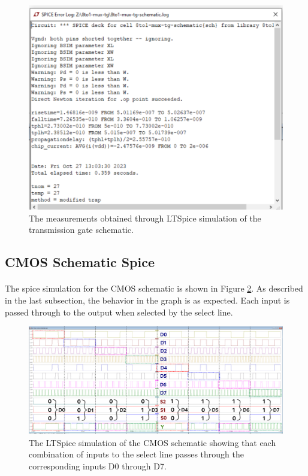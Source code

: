 \documentclass{article}
\begin{document}
    \begin{figure}[H]
      \centering
      \includegraphics[width=0.5\linewidth, frame]{screenshots/tg/schem/meas.png}
      \caption{The measurements obtained through LTSpice simulation of the transmission gate schematic.}
      \label{fig:tgschemmeas}
    \end{figure}



  \subsection{CMOS Schematic Spice}
    \paragraph{}
    The spice simulation for the CMOS schematic is shown in Figure \ref{fig:cmosspice}. As described in the last subsection, the behavior in the graph is as expected. Each input is passed through to the output when selected by the select line.


    \begin{figure}[H]
      \centering
      \includegraphics[width=\linewidth, frame]{screenshots/cmos/schem/spice.png}
      \caption{The LTSpice simulation of the CMOS schematic showing that each combination of inputs to the select line passes through the corresponding inputs D0 through D7.}
      \label{fig:cmosspice}
    \end{figure}
\end{document}
